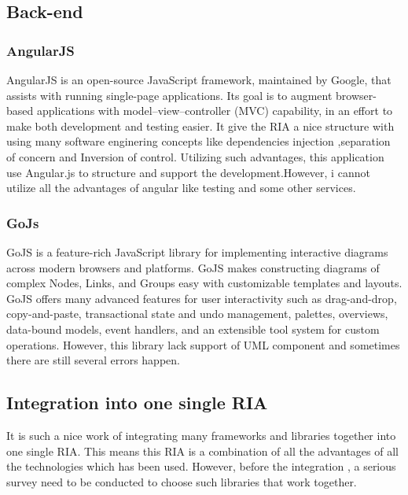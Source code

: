\documentclass[14pt,a4paper]{extreport}
\begin{document}
		\subsection{Back-end}
			\subsubsection{AngularJS}
				AngularJS is an open-source JavaScript framework, maintained by Google, that assists with running single-page applications. Its goal is to augment browser-based applications with model–view–controller (MVC) capability, in an effort to make both development and testing easier. It give the RIA a nice structure with using many software enginering concepts like dependencies injection ,separation of concern and Inversion of control. 
				Utilizing such advantages, this application use Angular.js to structure and support the development.However, i cannot utilize all the advantages of angular like testing and some other services.
 			\subsubsection{GoJs}
 				GoJS is a feature-rich JavaScript library for implementing interactive diagrams across modern browsers and platforms. GoJS makes constructing diagrams of complex Nodes, Links, and Groups easy with customizable templates and layouts. GoJS offers many advanced features for user interactivity such as drag-and-drop, copy-and-paste, transactional state and undo management, palettes, overviews, data-bound models, event handlers, and an extensible tool system for custom operations.
 				However, this library lack support of UML component and sometimes there are still several errors happen.
		
		\subsection{Integration into one single RIA}
			It is such a nice work of integrating many frameworks and libraries together into one single RIA. This means this RIA is a combination of all the advantages of all the technologies which has been used. However, before the integration , a serious survey need to be conducted to choose such libraries that work together.
		
\end{document}
